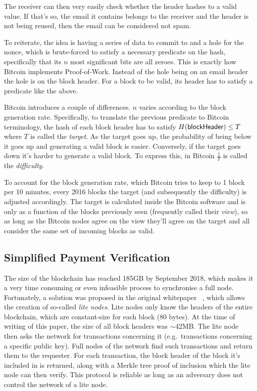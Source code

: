 The receiver can then very easily check whether the header hashes to a valid value. If that's so, the email it contains belongs to the receiver and the header is not being reused, then the email can be considered not spam.

To reiterate, the idea is having a series of data to commit to and a hole for the nonce, which is brute-forced to satisfy a necessary predicate on the hash, specifically that its $n$ most significant bits are all zeroes. This is exactly how Bitcoin implements Proof-of-Work. Instead of the hole being on an email header the hole is on the block header. For a block to be valid, its header has to satisfy a predicate like the above.

Bitcoin introduces a couple of differences. $n$ varies according to the block generation rate. Specifically, to translate the previous predicate to Bitcoin terminology, the hash of each block header has to satisfy $H({\sf blockHeader}) \le T$ where $T$ is called the \emph{target}. As the target goes up, the probability of being below it goes up and generating a valid block is easier. Conversely, if the target goes down it's harder to generate a valid block. To express this, in Bitcoin $\frac{1}{T}$ is called the \emph{difficulty}.

To account for the block generation rate, which Bitcoin tries to keep to 1 block per 10 minutes, every 2016 blocks the target (and subsequently the difficulty) is adjusted accordingly. The target is calculated inside the Bitcoin software and is only as a function of the blocks previously seen (frequently called their \emph{view}), so as long as the Bitcoin nodes agree on the view they'll agree on the target and all consider the same set of incoming blocks as valid.

\subsection{\label{subsec:spv}Simplified Payment Verification}
The size of the blockchain has reached 185GB by September 2018, which makes it a very time consuming or even infeasible process to synchronise a full node. Fortunately, a solution was proposed in the original whitepaper ~\cite{bitcoin}, which allows the creation of so-called \textit{lite nodes}.  Lite nodes only know the headers of the entire blockchain, which are constant-size for each block (80 bytes). At the time of writing of this paper, the size of all block headers was $\sim$42MB. The lite node then asks the network for transactions concerning it (e.g.\ transactions concerning a specific public key). Full nodes of the network find such transactions and return them to the requester. For each transaction, the block header of the block it's included in is returned, along with a Merkle tree proof of inclusion which the lite node can then verify. This protocol is reliable as long as an adversary does not control the network of a lite node.

